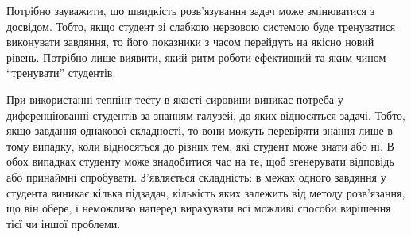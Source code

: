 Потрібно зауважити, що швидкість розв’язування задач може змінюватися з
досвідом.
Тобто, якщо студент зі слабкою нервовою системою буде тренуватися виконувати
завдяння, то його показники з часом перейдуть на якісно новий рівень.
Потрібно лише виявити, який ритм роботи ефективний та яким чином ``тренувати''
студентів.

При використанні теппінг-тесту в якості сировини виникає потреба у
диференціюванні студентів за знанням галузей, до яких відносяться задачі.
Тобто, якщо завдання однакової складності, то вони можуть перевіряти знання
лише в тому випадку, коли відносяться до різних тем, які студент може знати або
ні.
В обох випадках студенту може знадобитися час на те, щоб згенерувати відповідь
або принаймні спробувати.
З’являється складність: в межах одного завдяння у студента виникає кілька
підзадач, кількість яких залежить від методу розв’язання, що він обере,
і неможливо наперед вирахувати всі можливі способи вирішення тієї чи іншої
проблеми.
